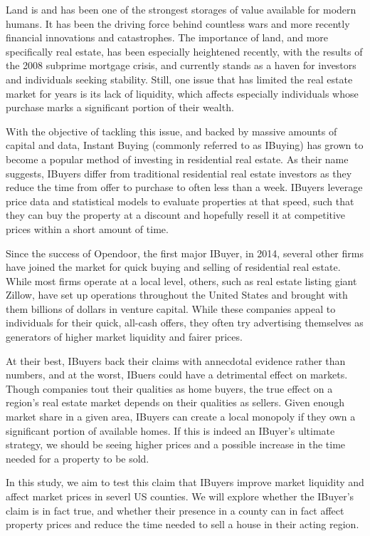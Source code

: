 Land is and has been one of the strongest storages of value available for modern humans. It has been the driving force behind countless wars and more recently financial innovations and catastrophes. The importance of land, and more specifically real estate, has been especially heightened recently, with the results of the 2008 subprime mortgage crisis, and currently stands as a haven for investors and individuals seeking stability. Still, one issue that has limited the real estate market for years is its lack of liquidity, which affects especially individuals whose purchase marks a significant portion of their wealth.  

With the objective of tackling this issue, and backed by massive amounts of capital and data, Instant Buying (commonly referred to as IBuying) has grown to become a popular method of investing in residential real estate. As their name suggests, IBuyers differ from traditional residential real estate investors as they reduce the time from offer to purchase to often less than a week. IBuyers leverage price data and statistical models to evaluate properties at that speed, such that they can buy the property at a discount and hopefully resell it at competitive prices within a short amount of time. 

Since the success of Opendoor, the first major IBuyer, in 2014, several other firms have joined the market for quick buying and selling of residential real estate. While most firms operate at a local level, others, such as real estate listing giant Zillow, have set up operations throughout the United States and brought with them billions of dollars in venture capital. While these companies appeal to individuals for their quick, all-cash offers, they often try advertising themselves as generators of higher market liquidity and fairer prices.  

At their best, IBuyers back their claims with annecdotal evidence rather than numbers, and at the worst, IBuers could have a detrimental effect on markets. Though companies tout their qualities as home buyers, the true effect on a region's real estate market depends on their qualities as sellers. Given enough market share in a given area, IBuyers can create a local monopoly if they own a significant portion of available homes. If this is indeed an IBuyer's ultimate strategy, we should be seeing higher prices and a possible increase in the time needed for a property to be sold.

In this study, we aim to test this claim that IBuyers improve market liquidity and affect market prices in severl US counties. We will explore whether the IBuyer's claim is in fact true, and whether their presence in a county can in fact affect property prices and reduce the time needed to sell a house in their acting region.
